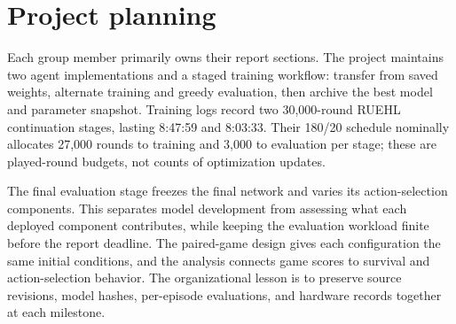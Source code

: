 \section{Project planning}
\label{sec:jesper-planning}
Each group member primarily owns their report sections. The project maintains
two agent implementations and a staged training workflow: transfer from saved
weights, alternate training and greedy evaluation, then archive the
best model and parameter snapshot. Training logs record two
30,000-round RUEHL continuation stages, lasting 8:47:59 and 8:03:33.
Their 180/20 schedule nominally allocates 27,000 rounds to training and
3,000 to evaluation per stage; these are played-round budgets, not counts
of optimization updates.

The final evaluation stage freezes the final network and varies its
action-selection components. This separates model development from
assessing what each deployed component contributes, while keeping the
evaluation workload finite before the report deadline. The paired-game
design gives each configuration the same initial conditions, and the
analysis connects game scores to survival and action-selection behavior. The
organizational lesson is to preserve source revisions, model hashes,
per-episode evaluations, and hardware records together at each milestone.
